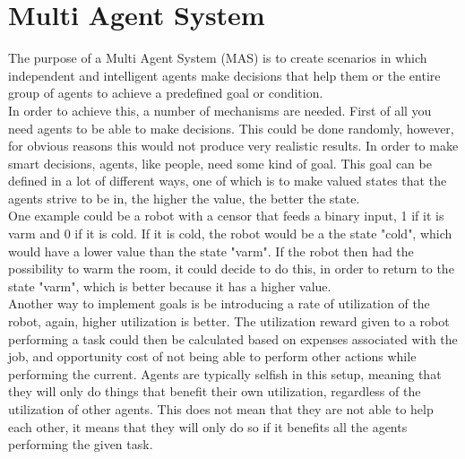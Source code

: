 \chapter{Multi Agent System}
The purpose of a Multi Agent System (MAS) is to create scenarios in which independent and intelligent agents make decisions that help them or the entire group of agents to achieve a predefined goal or condition.\\
\indent In order to achieve this, a number of mechanisms are needed. First of all you need agents to be able to make decisions. This could be done randomly, however, for obvious reasons this would not produce very realistic results. In order to make smart decisions, agents, like people, need some kind of goal. This goal can be defined in a lot of different ways, one of which is to make valued states that the agents strive to be in, the higher the value, the better the state.\\
\indent One example could be a robot with a censor that feeds a binary input, 1 if it is varm and 0 if it is cold. If it is cold, the robot would be a the state "cold", which would have a lower value than the state "varm". If the robot then had the possibility to warm the room, it could decide to do this, in order to return to the state "varm", which is better because it has a higher value.\\
\indent Another way to implement goals is be introducing a rate of utilization of the robot, again, higher utilization is better. The utilization reward given to a robot performing a task could then be calculated based on expenses associated with the job, and opportunity cost of not being able to perform other actions while performing the current. Agents are typically selfish in this setup, meaning that they will only do things that benefit their own utilization, regardless of the utilization of other agents. This does not mean that they are not able to help each other, it means that they will only do so if it benefits all the agents performing the given task.